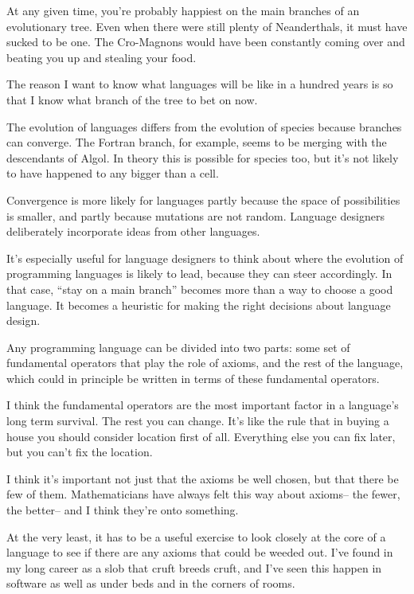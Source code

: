 At any given time, you're probably happiest on the main branches of an
evolutionary tree. Even when there were still plenty of Neanderthals, it
must have sucked to be one. The Cro-Magnons would have been constantly
coming over and beating you up and stealing your food.

The reason I want to know what languages will be like in a hundred years
is so that I know what branch of the tree to bet on now.

The evolution of languages differs from the evolution of species because
branches can converge. The Fortran branch, for example, seems to be
merging with the descendants of Algol. In theory this is possible for
species too, but it's not likely to have happened to any bigger than a
cell.

Convergence is more likely for languages partly because the space of
possibilities is smaller, and partly because mutations are not random.
Language designers deliberately incorporate ideas from other languages.

It's especially useful for language designers to think about where the
evolution of programming languages is likely to lead, because they can
steer accordingly. In that case, ``stay on a main branch'' becomes more
than a way to choose a good language. It becomes a heuristic for making
the right decisions about language design.

Any programming language can be divided into two parts: some set of
fundamental operators that play the role of axioms, and the rest of the
language, which could in principle be written in terms of these
fundamental operators.

I think the fundamental operators are the most important factor in a
language's long term survival. The rest you can change. It's like the
rule that in buying a house you should consider location first of all.
Everything else you can fix later, but you can't fix the location.

I think it's important not just that the axioms be well chosen, but that
there be few of them. Mathematicians have always felt this way about
axioms-- the fewer, the better-- and I think they're onto something.

At the very least, it has to be a useful exercise to look closely at the
core of a language to see if there are any axioms that could be weeded
out. I've found in my long career as a slob that cruft breeds cruft, and
I've seen this happen in software as well as under beds and in the
corners of rooms.

